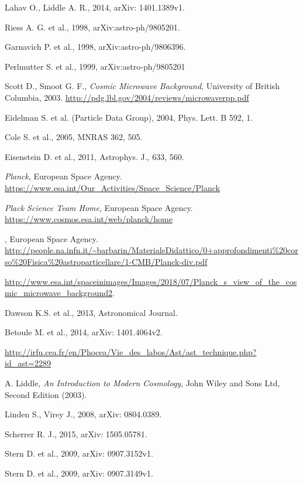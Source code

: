 \documentclass[onecolumn,           %
               showpacs,            %
               preprintnumbers,     %
               aps,                 %
               letterpaper,             %
               superscriptaddress,      %
               nofootinbib,         %
               tightenlines,        %
               floats,floatfix      %
               ,usenatbib,
               ]{revtex4-1}
\begin{document}
\begin{thebibliography}{9}
 Lahav O., Liddle A. R., 2014, arXiv: 1401.1389v1.

 Riess A. G. et al., 1998, 	arXiv:astro-ph/9805201.

 Garnavich P. et al., 1998, arXiv:astro-ph/9806396. 

 Perlmutter S. et al., 1999, arXiv:astro-ph/9805201

 Scott D.,  Smoot G. F., {\em Cosmic Microwave Background}, University of British Columbia, 2003. \url{http://pdg.lbl.gov/2004/reviews/microwaverpp.pdf} 

 Eidelman S. et al. (Particle Data Group), 2004, Phys. Lett. B 592, 1.

 Cole S. et al., 2005, MNRAS 362, 505.

 Eisenstein D. et al., 2011, Astrophys. J., 633, 560.

 {\em Planck}, European Space Agency. \url{https://www.esa.int/Our_Activities/Space_Science/Planck}

 {\em Plack Science Team Home}, European Space Agency. \url{https://www.cosmos.esa.int/web/planck/home}

, European Space Agency. \url{http://people.na.infn.it/~barbarin/MaterialeDidattico/0+approfondimenti%20corso%20Fisica%20astroparticellare/1-CMB/Planck-div.pdf}
	
\url{http://www.esa.int/spaceinimages/Images/2018/07/Planck_s_view_of_the_cosmic_microwave_background2}.

 Dawson K.S. et al., 2013, Astronomical Journal.

 Betoule M. et al., 2014, arXiv: 1401.4064v2.

 \url{http://irfu.cea.fr/en/Phocea/Vie_des_labos/Ast/ast_technique.php?id_ast=2289}

 A. Liddle, {\em An Introduction to Modern Cosmology}, John Wiley and Sons Ltd, Second Edition (2003).

 Linden S., Virey J., 2008, arXiv: 0804.0389.

 Scherrer R. J., 2015, arXiv: 1505.05781.

 Stern D. et al., 2009, arXiv: 0907.3152v1.

 Stern D. et al., 2009, arXiv: 0907.3149v1.

\end{thebibliography}
\end{document}
